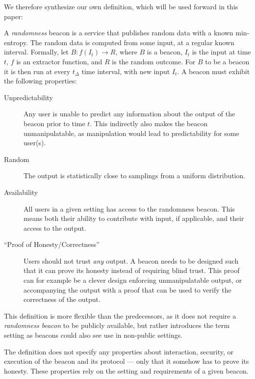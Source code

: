 We therefore synthesize our own definition, which will be used forward in this paper:

A \emph{randomness} beacon is a service that publishes random data with a known min-entropy. The random data is computed from some input, at a regular known interval.
Formally, let $B: f(I_t) \rightarrow R$, where $B$ is a beacon, $I_t$ is the input at time $t$, $f$ is an extractor function, and $R$ is the random outcome.
For $B$ to be a beacon it is then run at every $t_\Delta$ time interval, with new input $I_t$.
A beacon must exhibit the following properties:

\begin{description}
    \item[Unpredictability] Any user is unable to predict any information about the output of the beacon prior to time $t$. This indirectly also makes the beacon unmanipulatable, as manipulation would lead to predictability for some user(s).
    \item[Random] The output is statistically close to samplings from a uniform distribution.
    \item[Availability] All users in a given setting has access to the randomness beacon.
    This means both their ability to contribute with input, if applicable, and their access to the output.
    \item[``Proof of Honesty/Correctness''] Users should not trust \emph{any} output. A beacon needs to be designed such that it can prove its honesty instead of requiring blind trust. This proof can for example be a clever design enforcing unmanipulatable output, or accompanying the output with a proof that can be used to verify the correctness of the output.
\end{description}

This definition is more flexible than the predecessors, as it does not require a \emph{randomness beacon} to be publicly available, but rather introduces the term setting as beacons could also see use in non-public settings.

The definition does not specify any properties about interaction, security, or execution of the beacon and its protocol --- only that it somehow has to prove its honesty.
These properties rely on the setting and requirements of a given beacon.
